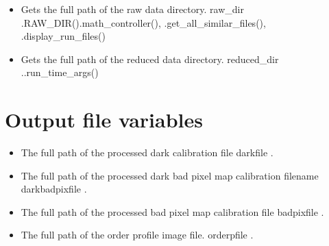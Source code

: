 \begin{itemize}
\item {}
{Gets the full path of the raw data directory.}
{raw\_dir}
{\AllRecipes}{\spirouConst.RAW\_DIR()}{\spirouFITS.math\_controller(), \spirouImage.get\_all\_similar\_files(), \spirouStartup.display\_run\_files()}


\item {} 
{Gets the full path of the reduced data directory.}
{reduced\_dir}
{\AllRecipes}{\spirouConst.}{\spirouStartup.run\_time\_args()}

\end{itemize}

\fi


\ifdevguide
\clearpage
\newpage
\section{Output file variables}
\label{ch:variables:outputvariables}

\begin{itemize}
	\item {} 
	{The full path of the processed dark calibration file}
	{darkfile}
	{\calDARK}{\spirouConst.}{\calDARK}
\end{itemize}

\begin{itemize}
	\item {} 
	{The full path of the processed dark bad pixel map calibration filename}
	{darkbadpixfile}
	{\calDARK}{\spirouConst.}{\calDARK}
\end{itemize}

\begin{itemize}
	\item {} 
	{The full path of the processed bad pixel map calibration file}
	{badpixfile}
	{\calbadpix}{\spirouConst.}{\calbadpix}
\end{itemize}

\begin{itemize}
	\item {} 
	{The full path of the order profile image file.}
	{orderpfile}
	{\callocRAW}{\spirouConst.}{\callocRAW}
\end{itemize}

